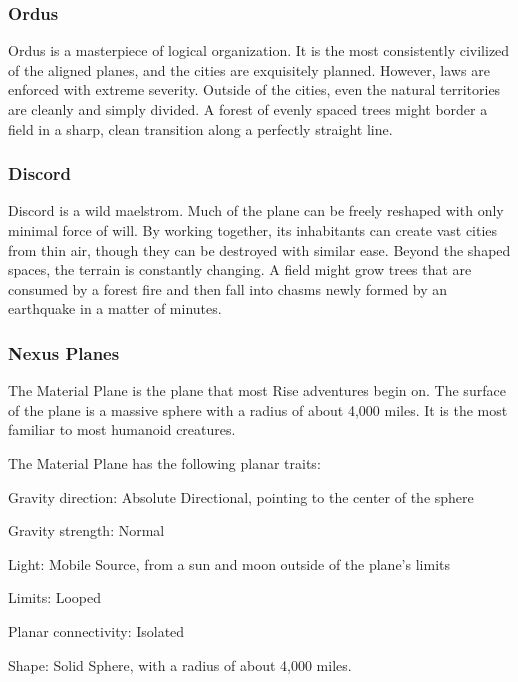     \subsubsection{Ordus}
      Ordus is a masterpiece of logical organization.
      It is the most consistently civilized of the aligned planes, and the cities are exquisitely planned.
      However, laws are enforced with extreme severity.
      Outside of the cities, even the natural territories are cleanly and simply divided.
      A forest of evenly spaced trees might border a field in a sharp, clean transition along a perfectly straight line.

    \subsubsection{Discord}
      Discord is a wild maelstrom.
      Much of the plane can be freely reshaped with only minimal force of will.
      By working together, its inhabitants can create vast cities from thin air, though they can be destroyed with similar ease.
      Beyond the shaped spaces, the terrain is constantly changing.
      A field might grow trees that are consumed by a forest fire and then fall into chasms newly formed by an earthquake in a matter of minutes.

    \subsubsection{Nexus Planes}

      The Material Plane is the plane that most Rise adventures begin on.
      The surface of the plane is a massive sphere with a radius of about 4,000 miles.
      It is the most familiar to most humanoid creatures.

      The Material Plane has the following planar traits:
      \begin{raggeditemize}
        \item Gravity direction: Absolute Directional, pointing to the center of the sphere
        \item Gravity strength: Normal
        \item Light: Mobile Source, from a sun and moon outside of the plane's limits
        \item Limits: Looped
        \item Planar connectivity: Isolated
        \item Shape: Solid Sphere, with a radius of about 4,000 miles.
      \end{raggeditemize}

